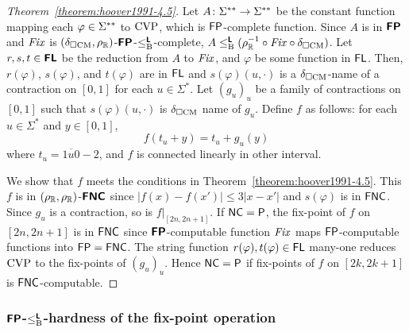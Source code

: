 \documentclass[a4paper,UKenglish]{lipics}
\begin{document}
\begin{proof}
[Theorem~\ref{theorem:hoover1991-4.5}]
 Let $A \colon \Sigma ^{**} \to \Sigma ^{**}$ be the constant function mapping each $\varphi \in \Sigma ^{**}$ to $\mathrm{CVP}$, which is $\mathsf{FP}$-complete function.
 Since  $A$ is in $\text{\bfseries \sffamily \upshape FP}$ and $\mathit{Fix}$ is $(\delta _{\square \mathrm{CM}}, \rho _\mathbb R)$-$\text{\bfseries \sffamily \upshape FP}$-$\leq _{\mathrm B} ^{\text{\bfseries \sffamily \upshape L}}$-complete, $A \leq _{\mathrm B} ^{\text{\bfseries \sffamily \upshape L}} (\rho _\mathbb R^{-1} \circ \mathit{Fix} \circ \delta _{\square \mathrm{CM}})$.
 Let $r,s,t \in \text{\bfseries \sffamily \upshape FL}$ be the reduction from $A$ to $\mathit{Fix}$,
 and $\varphi$ be some function in $\mathsf{FL}$.
 Then, $r(\varphi)$, $s(\varphi)$, and $t(\varphi)$ are in $\mathsf{FL}$ and
 $s(\varphi)(u, \cdot)$ is a $\delta _{\square \mathrm{CM}}$-name of a contraction on $[0,1]$ 
 for each $u \in \Sigma^*$.
 Let $(g_u)_u$ be a family of contractions on $[0,1]$
 such that $s(\varphi)(u, \cdot)$ is $\delta _{\square \mathrm{CM}}$ name of $g_u$.
 Define $f$ as follows: for each $u \in \Sigma^*$ and $y \in [0, 1]$,
 \begin{equation}
  \label{eq:def-f}
 f(t_u + y) = t_u + g_u(y)
 \end{equation}
 where $t_u = \overline{1u0}-2$, 
 and $f$ is connected linearly in other interval.

 We show that $f$ meets the conditions in Theorem~\ref{theorem:hoover1991-4.5}.
 This $f$ is in $(\rho _\mathbb R, \rho _\mathbb R)$-$\text{\bfseries \sffamily \upshape FNC}$ since 
 $|f(x) - f(x')| \le 3|x-x'|$ and $s(\varphi)$ is in $\mathsf{FNC}$.
 Since $g_u$ is a contraction, so is $f|_{[2n, 2n+1]}$.
 If $\mathsf{NC} = \mathsf{P}$,
 the fix-point of $f$ on $[2n, 2n+1]$ 
 is in $\mathsf{FNC}$ since $\text{\bfseries \sffamily \upshape FP}$-computable function 
 $\mathit{Fix}$ maps $\mathsf{FP}$-computable functions into $\mathsf{FP} = \mathsf{FNC}$.
 The string function $r(\varphi), t(\varphi) \in \mathsf{FL}$ many-one reduces
 $\mathrm{CVP}$ to the fix-points of $(g_u)_u$.
 Hence $\mathsf{NC} = \mathsf{P}$ if fix-points of $f$ on $[2k, 2k+1]$ is $\mathsf{FNC}$-computable.
\end{proof}

\subsubsection{$\text{\bfseries \sffamily \upshape FP}$-$\leq _{\mathrm B} ^{\text{\bfseries \sffamily \upshape L}}$-hardness of the fix-point operation}
\end{document}
